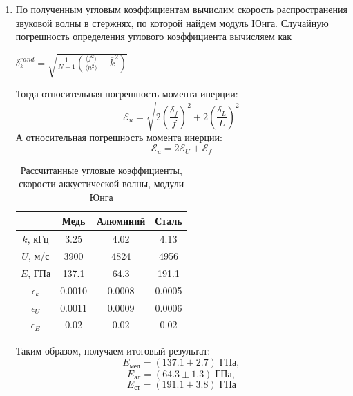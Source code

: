 \documentclass[a4paper, 10pt, twocolumn]{article}
\begin{document}
\begin{enumerate}
    \item По полученным угловым коэффициентам вычислим скорость распространения
    звуковой волны в стержнях, по которой найдем модуль Юнга.
    Случайную погрешность определения углового коэффициента вычисляем как
    \begin{center}
        $\delta^{rand}_k = \sqrt{\frac{1}{N-1}\left(\frac{\langle f^2 \rangle}{\langle n^2 \rangle} - \overline{k}^2\right)}$
    \end{center}
    Тогда относительная погрешность момента инерции: $$\mathcal{E}_{u} = \sqrt{2\left(\frac{\delta_f}{f}\right)^2
     + 2\left(\frac{\delta_L}{L}\right)^2}$$
    А относительная погрешность момента инерции: $$\mathcal{E}_{u} = 2\mathcal{E}_U + \mathcal{E}_f$$
    \begin{table}[h]
        \centering
        \caption{Рассчитанные угловые коэффициенты, скорости аккустической волны, модули Юнга}
        \begin{tabular}{|c|c|c|c|}
        \hline
                     & Медь    & Алюминий & Сталь   \\ \hline
        $k$, кГц     & 3.25    & 4.02        & 4.13 \\ \hline
        $U$, м/с     & 3900    & 4824        & 4956    \\ \hline
        $E$, ГПа     & 137.1     & 64.3      & 191.1     \\ \hline
        $\epsilon_k$ & 0.0010  & 0.0008      & 0.0005  \\ \hline
        $\epsilon_U$ & 0.0011  & 0.0009      & 0.0006  \\ \hline
        $\epsilon_E$ & 0.02    & 0.02        & 0.02    \\ \hline
        \end{tabular}
    \end{table}
    Таким образом, получаем итоговый результат:
    $$ E_{\text{мед}} = (137.1\pm2.7)\;\text{ГПа}, $$
    $$ E_{\text{ал}}  = (64.3\pm1.3)\;\text{ГПа}, $$
    $$ E_{\text{ст}}   = (191.1\pm3.8)\;\text{ГПа} $$
\end{enumerate}
\end{document}
